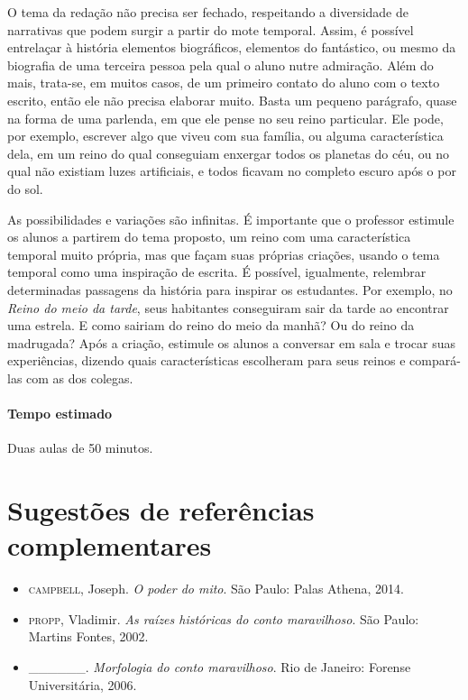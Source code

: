 \documentclass[11pt]{extarticle}
\begin{document}
O tema da redação não precisa ser fechado, respeitando a diversidade de narrativas que podem surgir a partir do mote temporal. Assim, é possível entrelaçar à história elementos biográficos, elementos do fantástico, ou mesmo da biografia de uma terceira pessoa pela qual o aluno nutre admiração. Além do mais, trata-se, em muitos casos, de um primeiro contato do aluno com o texto escrito, então ele não precisa elaborar muito. Basta um pequeno parágrafo, quase na forma de uma parlenda, em que ele pense no seu reino particular. Ele pode, por exemplo, escrever algo que viveu com sua família, ou alguma característica dela, em um reino do qual conseguiam enxergar todos os planetas do céu, ou no qual não existiam luzes artificiais, e todos ficavam no completo escuro após o por do sol.

As possibilidades e variações são infinitas. É importante que o professor estimule os alunos a partirem do tema proposto, um reino com uma característica temporal muito própria, mas que façam suas próprias criações, usando o tema temporal como uma inspiração de escrita. É possível, igualmente, relembrar determinadas passagens da história para inspirar os estudantes. Por exemplo, no \textit{Reino do meio da tarde}, seus habitantes conseguiram sair da tarde ao encontrar uma estrela. E como sairiam do reino do meio da manhã? Ou do reino da madrugada? Após a criação, estimule os alunos a conversar em sala e trocar suas experiências, dizendo quais características escolheram para seus reinos e compará-las com as dos colegas.

\paragraph{Tempo estimado} Duas aulas de 50 minutos.

\section{Sugestões de referências complementares}


\begin{itemize}
\item \textsc{campbell}, Joseph. \textit{O poder do mito}. São Paulo: Palas Athena, 2014.

\item \textsc{propp}, Vladimir. \textit{As raízes históricas do conto maravilhoso}. São Paulo: Martins Fontes, 2002.

\item \_\_\_\_\_\_. \emph{Morfologia do conto maravilhoso}. Rio de Janeiro: Forense Universitária, 2006. 
\end{itemize}
\end{document}

